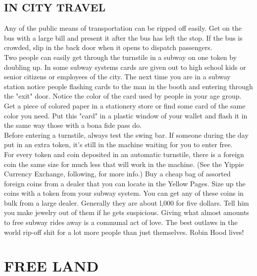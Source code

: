 \documentclass[11pt,twoside,a4paper]{book}
\begin{document}
\subsection{IN CITY TRAVEL}

Any of the public means of transportation can be ripped off easily. Get on the bus with a large bill and present it after the bus has left the stop. If the bus is crowded, slip in the back door when it opens to dispatch passengers.~\\

Two people can easily get through the turnstile in a subway on one token by doubling up. In some subway systems cards are given out to high school kids or senior citizens or employees of the city. The next time you are in a subway station notice people flashing cards to the man in the booth and entering through the "exit" door. Notice the color of the card used by people in your age group. Get a piece of colored paper in a stationery store or find some card of the same color you need. Put this "card" in a plastic window of your wallet and flash it in the same way those with a bona fide pass do.~\\

Before entering a turnstile, always test the swing bar. If someone during the day put in an extra token, it's still in the machine waiting for you to enter free.~\\

For every token and coin deposited in an automatic turnstile, there is a foreign coin the same size for much less that will work in the machine. (See the Yippie Currency Exchange, following, for more info.) Buy a cheap bag of assorted foreign coins from a dealer that you can locate in the Yellow Pages. Size up the coins with a token from your subway system. You can get any of these coins in bulk from a large dealer. Generally they are about l,000 for five dollars. Tell him you make jewelry out of them if he gets suspicious. Giving what almost amounts to free subway rides away is a communal act of love. The best outlaws in the world rip-off shit for a lot more people than just themselves. Robin Hood lives!
	
\section{FREE LAND}
\end{document}
